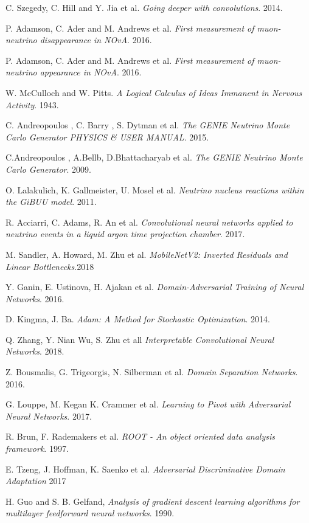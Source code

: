 \documentclass{report}
\begin{document}
\begin{thebibliography}{}
C. Szegedy, C. Hill  and Y. Jia et al.
\textit{Going deeper with convolutions}. 
2014.

P. Adamson, C. Ader and M. Andrews et al.
\textit{First measurement of muon-neutrino disappearance in NOvA}. 
2016.

P. Adamson, C. Ader and M. Andrews et al.
\textit{First measurement of muon-neutrino appearance in NOvA}. 
2016.

W. McCulloch and W. Pitts. 
\textit{A Logical Calculus of Ideas Immanent in Nervous Activity}. 
1943.

C. Andreopoulos , C. Barry , S. Dytman et al.
\textit{The GENIE Neutrino Monte Carlo Generator PHYSICS \& USER MANUAL}. 
2015.

C.Andreopoulos , A.Bellb, D.Bhattacharyab et al.
\textit{The GENIE Neutrino Monte Carlo Generator}. 
2009.

O. Lalakulich, K. Gallmeister, U. Mosel et al.
\textit{Neutrino nucleus reactions within the GiBUU model}. 
2011.

R. Acciarri, C. Adams, R. An et al.
\textit{Convolutional neural networks applied to neutrino events in a liquid argon time projection chamber}. 
2017.

M. Sandler, A. Howard, M. Zhu et al.
\textit{MobileNetV2: Inverted Residuals and Linear Bottlenecks}.2018

Y. Ganin, E. Ustinova, H. Ajakan et al.
\textit{Domain-Adversarial Training of Neural Networks}.
2016. 

D. Kingma, J. Ba.
\textit{Adam: A Method for Stochastic Optimization}.
2014. 

Q. Zhang, Y. Nian Wu,  S. Zhu et all
\textit{Interpretable Convolutional Neural Networks}.
2018. 

Z. Bousmalis, G. Trigeorgis, N. Silberman et al.
\textit{Domain Separation Networks}.
2016.

G. Louppe, M. Kegan K. Crammer et al.
\textit{Learning to Pivot with Adversarial Neural Networks}.
2017.

R. Brun, F. Rademakers et al.
\textit{ROOT - An object oriented data analysis framework}.
1997.

E. Tzeng, J. Hoffman, K. Saenko et al.
\textit{Adversarial Discriminative Domain Adaptation}
2017

H. Guo and S. B. Gelfand,
\textit{Analysis of gradient descent learning algorithms for multilayer feedforward neural networks}.
1990.
\end{thebibliography}
\end{document}
